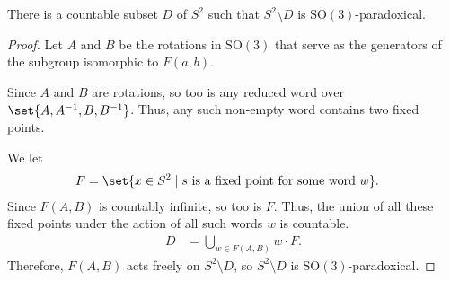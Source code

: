 \begin{theorem}
  There is a countable subset $D$ of $S^{2}$ such that $S^{2}\setminus D$ is $\text{SO}(3)$-paradoxical.
\end{theorem}
\begin{proof}
  Let $A$ and $B$ be the rotations in $\text{SO}(3)$ that serve as the generators of the subgroup isomorphic to $F(a,b)$.\newline

  Since $A$ and $B$ are rotations, so too is any reduced word over $\set{A,A^{-1},B,B^{-1}}$. Thus, any such non-empty word contains two fixed points.\newline

  We let
  \begin{align*}
    F &= \set{x\in S^{2}\mid s\text{ is a fixed point for some word }w}.
  \end{align*}
  Since $F(A,B)$ is countably infinite, so too is $F$. Thus, the union of all these fixed points under the action of all such words $w$ is countable.
  \begin{align*}
    D &= \bigcup_{w\in F(A,B)} w\cdot F.
  \end{align*}
  Therefore, $F(A,B)$ acts freely on $S^{2}\setminus D$, so $S^{2}\setminus D$ is $\text{SO}(3)$-paradoxical.
\end{proof}

